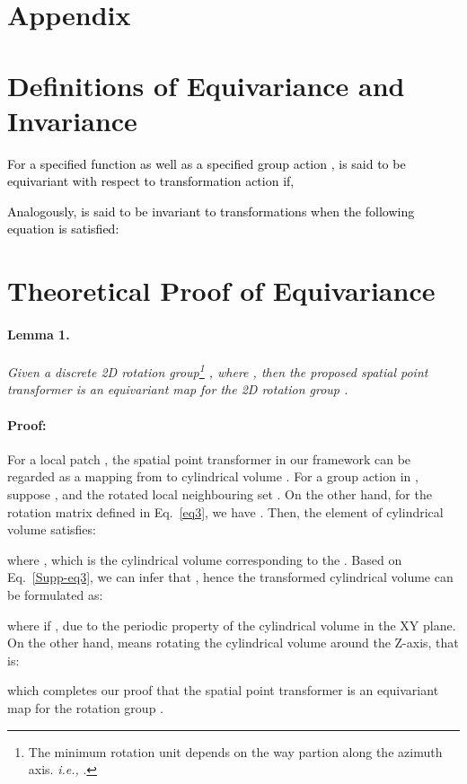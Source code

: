 \documentclass[final]{cvpr}
\newcommand{\qysupp}[1]{\textcolor{black}{#1}}
\begin{document}
\newpage
\appendix
\section*{Appendix} 
\section{Definitions of Equivariance and Invariance}
\qysupp{For a specified function  as well as a specified group action ,  is said to be equivariant with respect to transformation action  if,}

\qysupp{Analogously,  is said to be invariant to transformations  when the following equation is satisfied: }


\section{Theoretical Proof of Equivariance}


\paragraph{Lemma 1.}\textit{Given a discrete 2D rotation group\footnote{The minimum rotation unit depends on the way partion along the azimuth axis. \textit{i.e.,} .} , where , then the proposed spatial point transformer is an equivariant map for the 2D rotation group .}

\paragraph{Proof:} For a local patch , the spatial point transformer in our framework can be regarded as a mapping  from  to cylindrical volume . For a group action  in , suppose , and the rotated local neighbouring set  . On the other hand, for the rotation matrix defined in Eq.~\ref{eq3}, we have . Then, the  element  of cylindrical volume  satisfies:

where , which is the cylindrical volume corresponding to the  . Based on Eq.~\ref{Supp-eq3}, we can infer that , hence the transformed cylindrical volume  can be formulated as:

where  if , due to the periodic property of the cylindrical volume in the XY plane. On the other hand,  means rotating the cylindrical volume  around the Z-axis, that is:

which completes our proof that the spatial point transformer  is an equivariant map for the rotation group . 
\end{document}
